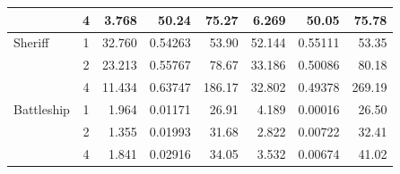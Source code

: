 \begin{table}[t]
\begin{tabular*}{\textwidth}{@{\extracolsep{\fill}}lcrrrrrr@{}}
 & 4 & 3.768 & 50.24 & 75.27 & 6.269 & 50.05 & 75.78\\
\hline
Sheriff & 1 & 32.760 & 0.54263 & 53.90 & 52.144 & 0.55111 & 53.35\\
 & 2 & 23.213 & 0.55767 & 78.67 & 33.186 & 0.50086 & 80.18\\
 & 4 & 11.434 & 0.63747 & 186.17 & 32.802 & 0.49378 & 269.19\\
\hline
Battleship & 1 & 1.964 & 0.01171 & 26.91 & 4.189 & 0.00016 & 26.50\\
 & 2 & 1.355 & 0.01993 & 31.68 & 2.822 & 0.00722 & 32.41\\
 & 4 & 1.841 & 0.02916 & 34.05 & 3.532 & 0.00674 & 41.02\\
\hline
\end{tabular*}
\end{table}
